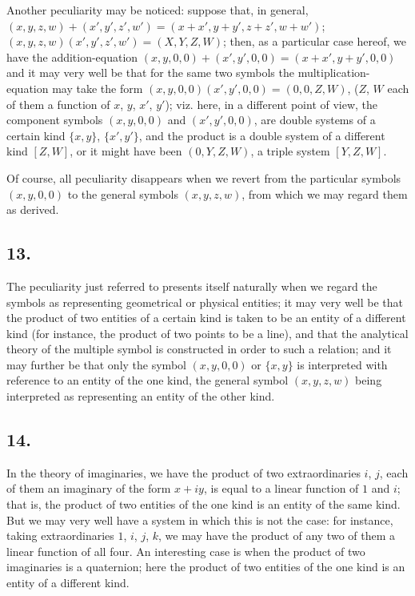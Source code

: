 \documentclass[11pt,a4paper]{article}
\theoremstyle{definition}
\begin{document}
Another peculiarity may be noticed: suppose that, in general, $(x, y, z, w) + (x', y', z', w') = (x + x', y + y', z + z', w + w')$; $(x, y, z, w)(x', y', z', w') = (X, Y, Z, W)$; then, as a particular case hereof, we have the addition-equation $(x, y, 0, 0) + (x', y', 0, 0) = (x + x', y + y', 0, 0)$ and it may very well be that for the same two symbols the multiplication-equation may take the form $(x, y, 0, 0)(x', y', 0, 0) = (0, 0, Z, W)$, ($Z$, $W$ each of them a function of $x$, $y$, $x'$, $y'$); viz. here, in a different point of view, the component symbols $(x, y, 0, 0)$ and $(x', y', 0, 0)$, are double systems of a certain kind $\{x, y\}$, $\{x', y'\}$, and the product is a double system of a different kind $[Z, W]$, or it might have been $(0, Y, Z, W)$, a triple system $[Y, Z, W]$.

Of course, all peculiarity disappears when we revert from the particular symbols $(x, y, 0, 0)$ to the general symbols $(x, y, z, w)$, from which we may regard them as derived.

\subsection*{13.}

The peculiarity just referred to presents itself naturally when we regard the symbols as representing geometrical or physical entities; it may very well be that the product of two entities of a certain kind is taken to be an entity of a different kind (for instance, the product of two points to be a line), and that the analytical theory of the multiple symbol is constructed in order to such a relation; and it may further be that only the symbol $(x, y, 0, 0)$ or $\{x, y\}$ is interpreted with reference to an entity of the one kind, the general symbol $(x, y, z, w)$ being interpreted as representing an entity of the other kind.

\subsection*{14.}

In the theory of imaginaries, we have the product of two extraordinaries $i$, $j$, each of them an imaginary of the form $x + iy$, is equal to a linear function of $1$ and $i$; that is, the product of two entities of the one kind is an entity of the same kind. But we may very well have a system in which this is not the case: for instance, taking extraordinaries $1$, $i$, $j$, $k$, we may have the product of any two of them a linear function of all four. An interesting case is when the product of two imaginaries is a quaternion; here the product of two entities of the one kind is an entity of a different kind.
\end{document}
